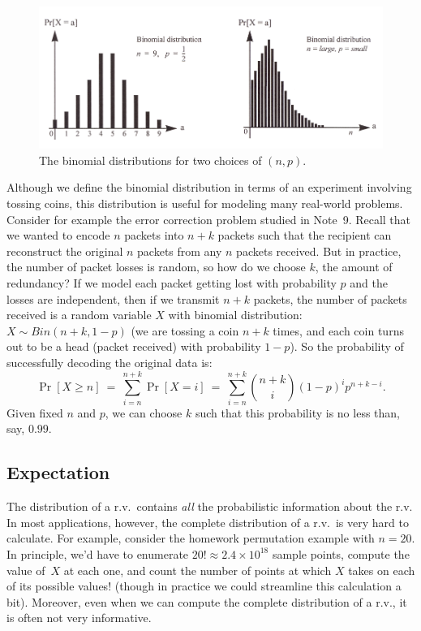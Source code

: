 \documentclass[11pt]{article}
\begin{document}
\begin{figure}[h!]
\centering
\includegraphics{binomial}
\caption{The binomial distributions for two choices of $(n,p)$.}
\label{fig:binomial}
\end{figure}

Although we define the binomial distribution in terms of an experiment involving tossing coins, this distribution is useful for modeling many real-world problems. Consider for example the error correction problem studied in Note~9. Recall that we wanted to encode $n$ packets into $n+k$ packets such that the recipient can reconstruct the original $n$ packets from any $n$ packets received. But in practice, the number of packet losses is random, so how do we choose $k$, the amount of redundancy? If we model each packet getting lost with probability $p$ and the losses are independent, then if we transmit $n+k$ packets, the number of packets received is a random variable $X$ with binomial distribution: $X \sim Bin(n+k,1-p)$ (we are tossing a coin $n+k$ times, and each coin turns out to be a head (packet received) with probability $1-p$).  So the probability
of successfully decoding the original data is:
$$ \Pr[X \ge n] ~=~ \sum_{i=n}^{n+k} \Pr[X = i] ~=~ \sum_{i=n}^{n+k} {n+k \choose i} (1-p)^i p^{n+k-i}.$$
Given fixed $n$ and $p$, we can choose $k$ such that this probability is no less than, say, $0.99$.



\subsection*{Expectation}

The distribution of a r.v.\ contains {\em all} the probabilistic information about the r.v.
In most applications, however, the complete distribution of a r.v.\ is
very hard to calculate. For example, consider the homework permutation example with $n = 20$. 
In principle, we'd have to enumerate $20!\approx 2.4\times10^{18}$ sample points, compute
the value of~$X$ at each one, and count the number of points
at which $X$ takes on each of its possible values! (though in
practice we could streamline this calculation a bit).
Moreover, even when we can compute the complete distribution
of a r.v., it is often not very informative.
\end{document}
